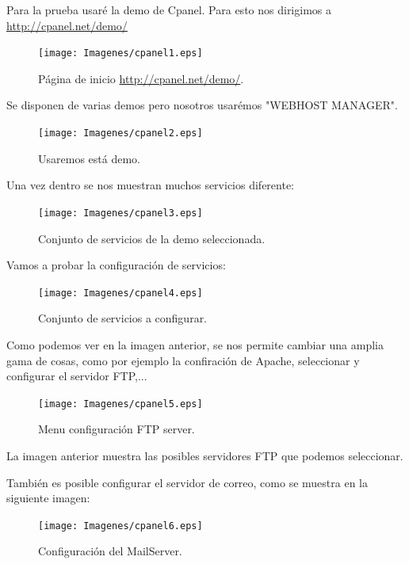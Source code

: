 Para la prueba usaré la demo de Cpanel. Para esto nos dirigimos a \url{http://cpanel.net/demo/}

\begin{figure}[H]
\begin{center}
\texttt{[image: Imagenes/cpanel1.eps]}
\caption{Página de inicio \url{http://cpanel.net/demo/}.}
\end{center}
\end{figure}


Se disponen de varias demos pero nosotros usarémos "WEBHOST MANAGER".

\begin{figure}[H]
\begin{center}
\texttt{[image: Imagenes/cpanel2.eps]}
\caption{Usaremos está demo.}
\end{center}
\end{figure}

Una vez dentro se nos muestran muchos servicios diferente:

\begin{figure}[H]
\begin{center}
\texttt{[image: Imagenes/cpanel3.eps]}
\caption{Conjunto de servicios de la demo seleccionada.}
\end{center}
\end{figure}

Vamos a probar la configuración de servicios:
\begin{figure}[H]
\begin{center}
\texttt{[image: Imagenes/cpanel4.eps]}
\caption{Conjunto de servicios a configurar.}
\end{center}
\end{figure}


Como podemos ver en la imagen anterior, se nos permite cambiar una amplia gama de cosas, como por ejemplo la confiración de Apache, seleccionar y configurar el servidor FTP,...


\begin{figure}[H]
\begin{center}
\texttt{[image: Imagenes/cpanel5.eps]}
\caption{Menu configuración FTP server.}
\end{center}
\end{figure}

La imagen anterior muestra las posibles servidores FTP que podemos seleccionar.

También es posible configurar el servidor de correo, como se muestra en la siguiente imagen:

\begin{figure}[H]
\begin{center}
\texttt{[image: Imagenes/cpanel6.eps]}
\caption{Configuración del MailServer.}
\end{center}
\end{figure}

